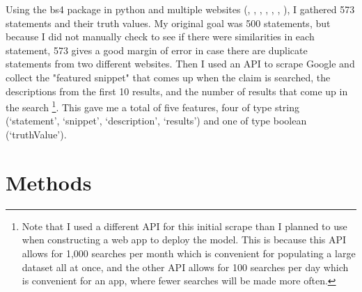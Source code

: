 \documentclass[]{article}
\begin{document}
			
		Using the bs4 package in python and multiple websites (\cite{tf1}, \cite{tf2}, \cite{tf3}, \cite{tf4}, \cite{tf5}, \cite{tf6}, \cite{tf7}), I gathered 573 statements and their truth values. My original goal was 500 statements, but because I did not manually check to see if there were similarities in each statement, 573 gives a good margin of error in case there are duplicate statements from two different websites. Then I used an API to scrape Google and collect the "featured snippet" that comes up when the claim is searched, the descriptions from the first 10 results, and the number of results that come up in the search \cite{a_api}
		\footnote{Note that I used a different API for this initial scrape than I planned to use when constructing a web app to deploy the model. This is because this API allows for 1,000 searches per month which is convenient for populating a large dataset all at once, and the other API allows for 100 searches per day which is convenient for an app, where fewer searches will be made more often.}. 
		This gave me a total of five features, four of type string (`statement', `snippet', `description', `results') and one of type boolean (`truthValue').
		
	\section{Methods}
		
		
		
		
\end{document}
